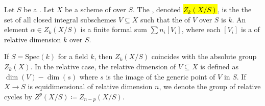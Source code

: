 \begin{definition} \label{definition:k_dimensional_relative_algebraic_cycles_of_a_finite_type_scheme_over_a_noetherian_base}
Let $S$ be a . Let $X$ be a scheme of  over $S$.
The , denoted \hl{$Z_k(X/S)$}, is the  the set of all closed integral subschemes $V \subseteq X$ such that the  of $V$ over $S$ is $k$. 
An element $\alpha \in Z_k(X/S)$ is a finite formal sum $\sum n_i [V_i]$, where each $[V_i]$ is a  of relative dimension $k$ over $S$.
\end{definition}
\begin{remark}
If $S = \mathrm{Spec}(k)$ for a field $k$, then $Z_k(X/S)$ coincides with the absolute group $Z_k(X)$. In the relative case, the relative dimension of $V \subseteq X$ is defined as $\dim(V) - \dim(s)$ where $s$ is the image of the generic point of $V$ in $S$. If $X \to S$ is equidimensional of relative dimension $n$, we denote the group of relative  cycles by $Z^p(X/S) \coloneqq Z_{n-p}(X/S)$.
\end{remark}
